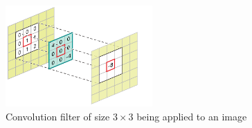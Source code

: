 \begin{figure}[H]
  \centering
  \includegraphics[width=0.5\textwidth]{figures/images/conv.png}
  \caption[Convolution filter]{Convolution filter of size $3\times 3$ being applied to an image \cite{apple0000blurring}}
  \label{fig:conv}
\end{figure}
